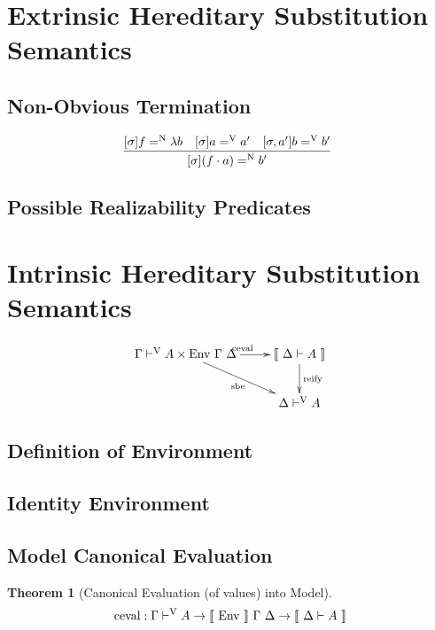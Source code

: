 \documentclass[preprint,nonatbib]{sigplanconf}
\numberwithin{subdefin}{defin}
\theoremstyle{definition}
\newtheorem{theorem}{Theorem}
\numberwithin{subtheorem}{theorem}
\numberwithin{sublemma}{theorem}
\numberwithin{corollary}{theorem}
\numberwithin{case}{theorem}
\numberwithin{slcase}{sublemma}
\numberwithin{scase}{subtheorem}
\numberwithin{lcase}{lemma}
\def\cross{\times}
\def\marr{\rightarrow}
\def\app{\cdot}
\def\lam{\lambda}
\def\cevalv{\fun{ceval}}
\newcommand{\turn}[1]{\vdash^\con{#1}}
\newcommand{\hsubn}[2]{[\sigma]#1=^\con{N}#2}
\newcommand{\hsub}[2]{[\sigma]#1=^\con{V}#2}
\newcommand{\hsubext}[3]{[\sigma, #1]#2=^\con{V}#3}
\newcommand{\el}[1]{\llbracket ~ #1 ~ \rrbracket}
\newcommand{\con}[1]{\textmd{#1}}
\newcommand{\fun}[1]{\textmd{#1}}
\newcommand{\dtypm}[1]{\el{\Delta \vdash #1}}
\newcommand{\typv}[1]{\Gamma \turn{V} #1}
\newcommand{\dtypv}[1]{\Delta \turn{V} #1}
\def\menv{\el{\fun{Env}}~\Gamma~\Delta}
\def\env{\fun{Env}~\Gamma~\Delta}
\begin{document}
\section{Extrinsic Hereditary Substitution Semantics}
\label{sec:vpred}

\subsection{Non-Obvious Termination}

$$
\infer
  []{\hsubn{(f \app a)}{b'}}
{
  \hsubn{f}{\lam b}
  &
  \hsub{a}{a'}
  &
  \hsubext{a'}{b}{b'}
}
$$

\subsection{Possible Realizability Predicates}

\section{Intrinsic Hereditary Substitution Semantics}
\label{sec:vmod}

\begin{displaymath}
    \xymatrix{
          {\typv{A} \cross \env} 
          \ar[dr]_{\fun{sbe}}
          \ar[r]^{\fun{ceval}}
        & {\dtypm{A}}
          \ar[d]^{\large{\fun{reify}}}
\\      & \dtypv{A} }
\end{displaymath}

\subsection{Definition of Environment}


\subsection{Identity Environment}


\subsection{Model Canonical Evaluation}

\begin{theorem}[Canonical Evaluation (of values) into Model]
\label{thm:mod:cevalv}
$$
\cevalv : \typv{A} \marr \menv \marr \dtypm{A}
$$
\end{theorem}
\end{document}
